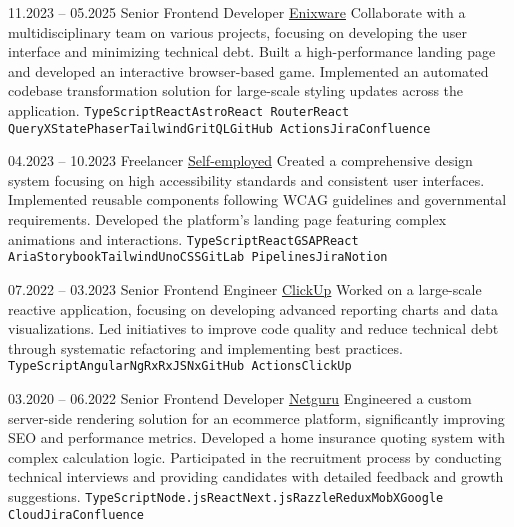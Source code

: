 \documentclass[9pt]{config}
\begin{document}
\vspace{12pt}



\begin{entrylist}
  \entry
  {11.2023 -- 05.2025}
  {Senior Frontend Developer}
  {\href{https://enixware.com}{Enixware}}
  {Collaborate with a multidisciplinary team on various projects, focusing on developing the user interface and minimizing technical debt. Built a high-performance landing page and developed an interactive browser-based game. Implemented an automated codebase transformation solution for large-scale styling updates across the application.}
  {\texttt{TypeScript}\slashsep\texttt{React}\slashsep\texttt{Astro}\slashsep\texttt{React Router}\slashsep\texttt{React Query}\slashsep\texttt{XState}\slashsep\texttt{Phaser}\slashsep\texttt{Tailwind}\slashsep\texttt{GritQL}\slashsep\texttt{GitHub Actions}\slashsep\texttt{Jira}\slashsep\texttt{Confluence}}

  \entry
  {04.2023 -- 10.2023}
  {Freelancer}
  {\href{https://jsarnowski.com}{Self-employed}}
  {Created a comprehensive design system focusing on high accessibility standards and consistent user interfaces. Implemented reusable components following WCAG guidelines and governmental requirements. Developed the platform's landing page featuring complex animations and interactions.}
  {\texttt{TypeScript}\slashsep\texttt{React}\slashsep\texttt{GSAP}\slashsep\texttt{React Aria}\slashsep\texttt{Storybook}\slashsep\texttt{Tailwind}\slashsep\texttt{UnoCSS}\slashsep\texttt{GitLab Pipelines}\slashsep\texttt{Jira}\slashsep\texttt{Notion}}

  \entry
  {07.2022 -- 03.2023}
  {Senior Frontend Engineer}
  {\href{https://clickup.com}{ClickUp}}
  {Worked on a large-scale reactive application, focusing on developing advanced reporting charts and data visualizations. Led initiatives to improve code quality and reduce technical debt through systematic refactoring and implementing best practices.}
  {\texttt{TypeScript}\slashsep\texttt{Angular}\slashsep\texttt{NgRx}\slashsep\texttt{RxJS}\slashsep\texttt{Nx}\slashsep\texttt{GitHub Actions}\slashsep\texttt{ClickUp}}

  \entry
  {03.2020 -- 06.2022}
  {Senior Frontend Developer}
  {\href{https://netguru.com}{Netguru}}
  {Engineered a custom server-side rendering solution for an ecommerce platform, significantly improving SEO and performance metrics. Developed a home insurance quoting system with complex calculation logic. Participated in the recruitment process by conducting technical interviews and providing candidates with detailed feedback and growth suggestions.}
  {\texttt{TypeScript}\slashsep\texttt{Node.js}\slashsep\texttt{React}\slashsep\texttt{Next.js}\slashsep\texttt{Razzle}\slashsep\texttt{Redux}\slashsep\texttt{MobX}\slashsep\texttt{Google Cloud}\slashsep\texttt{Jira}\slashsep\texttt{Confluence}}


\end{entrylist}
\end{document}
